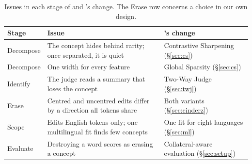 \begin{table}[t]
  \centering
  \small
  \setlength{\tabcolsep}{3pt}
  \begin{tabular}{@{}P{1.45cm}P{3.15cm}P{2.3cm}@{}}
    \toprule
    Stage & Issue & \cinder{}'s change \\
    \midrule
    Decompose & The concept hides behind rarity; once separated, it is quiet & Contrastive Sharpening (\S\ref{sec:cs}) \\
    Decompose & One width for every feature & Global Sparsity (\S\ref{sec:cs}) \\
    Identify & The judge reads a summary that loses the concept & Two-Way Judge (\S\ref{sec:twj}) \\
    Erase & Centred and uncentred edits differ by a direction all tokens share & Both variants (\S\ref{sec:cinderz}) \\
    Scope & Edits English tokens only; one multilingual fit finds few concepts & One fit for eight languages (\S\ref{sec:ml}) \\
    Evaluate & Destroying a word scores as erasing a concept & Collateral-aware evaluation (\S\ref{sec:setup}) \\
    \bottomrule
  \end{tabular}
  \caption{Issues in each stage of \ember{} and \cinder{}'s change. The Erase row concerns a choice in our own design.}
  \label{tab:diagnosis}
\end{table}
